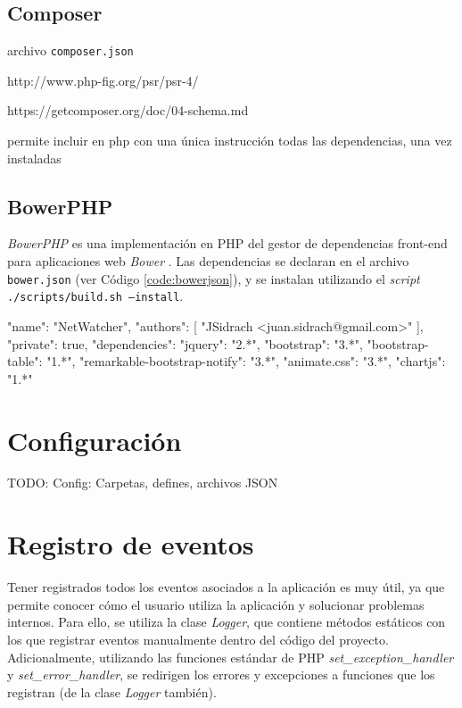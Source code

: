 \subsection*{Composer\label{extra:mvc:composer}}

archivo \texttt{composer.json}

http://www.php-fig.org/psr/psr-4/

https://getcomposer.org/doc/04-schema.md

permite incluir en php con una única instrucción todas las dependencias, una vez instaladas

\subsection*{BowerPHP\label{extra:mvc:bowerphp}}

\textit{BowerPHP} es una implementación en \gls{PHP} del gestor de dependencias \gls{front-end} para aplicaciones web \textit{Bower} \cite{bower}. Las dependencias se declaran en el archivo \texttt{bower.json} (ver Código \ref{code:bowerjson}), y se instalan utilizando el \textit{script} \texttt{./scripts/build.sh --install}.

\begin{code}[label=code:bowerjson,language=json,caption=Ejemplo de fichero \textit{bower.json}]
{
  "name": "NetWatcher",
  "authors": [
    "JSidrach <juan.sidrach@gmail.com>"
  ],
  "private": true,
  "dependencies": {
    "jquery": "2.*",
    "bootstrap": "3.*",
    "bootstrap-table": "1.*",
    "remarkable-bootstrap-notify": "3.*",
    "animate.css": "3.*",
    "chartjs": "1.*"
  }
}
\end{code}

\section{Configuración\label{extra:mvc:config}}

TODO: Config: Carpetas, defines, archivos JSON

\section{Registro de eventos\label{extra:mvc:logger}}

Tener registrados todos los eventos asociados a la aplicación es muy útil, ya que permite conocer cómo el usuario utiliza la aplicación y solucionar problemas internos. Para ello, se utiliza la clase \textit{Logger}, que contiene métodos estáticos con los que registrar eventos manualmente dentro del código del proyecto. Adicionalmente, utilizando las funciones estándar de \gls{PHP} \textit{set\_exception\_handler} y \textit{set\_error\_handler}, se redirigen los errores y excepciones a funciones que los registran (de la clase \textit{Logger} también).

